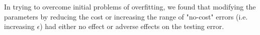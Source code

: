 \documentclass[conference]{IEEEtran}
\begin{document}
{In trying to overcome initial problems of overfitting, we found that modifying the parameters by reducing the cost or increasing the  range of "no-cost" errors (i.e. increasing $\epsilon$) had either no effect or adverse effects on the testing error.


%
%



%
%


}
\end{document}
